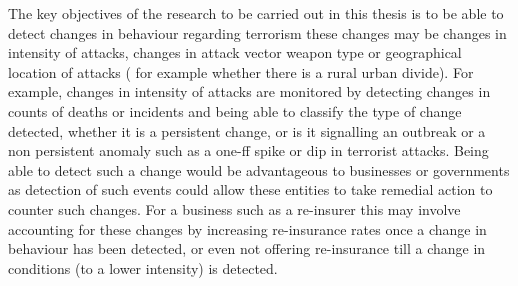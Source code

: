 The key objectives of the research to be carried out in this thesis is to be able to detect changes in behaviour regarding terrorism these changes may be changes in intensity of attacks, changes in attack vector weapon type or geographical location of attacks ( for example whether there is a rural urban divide). For example, changes in intensity of attacks are monitored by detecting changes in counts of deaths or incidents and being able to classify the type of change detected, whether it is a persistent change, or is it signalling an outbreak or a non persistent anomaly such as a one-ff spike or dip in terrorist attacks. Being able to detect such a change would be advantageous to businesses or governments as detection of such events could allow these entities to take remedial action to counter such changes. For a business such as a re-insurer this may involve accounting for these changes by increasing re-insurance rates once a change in behaviour has been detected, or even not offering re-insurance till a change in conditions (to a lower intensity) is detected.